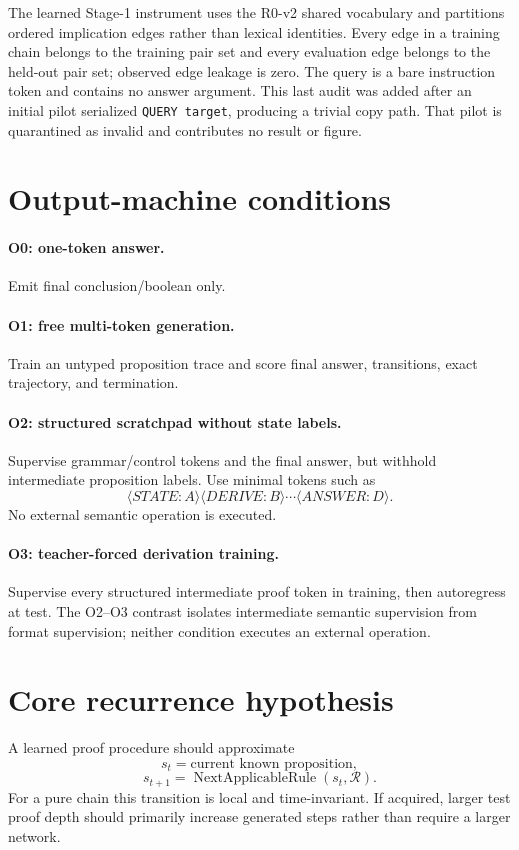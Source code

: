 \documentclass[10pt]{article}
\begin{document}
The learned Stage-1 instrument uses the R0-v2 shared vocabulary and partitions ordered implication edges rather than lexical identities. Every edge in a training chain belongs to the training pair set and every evaluation edge belongs to the held-out pair set; observed edge leakage is zero. The query is a bare instruction token and contains no answer argument. This last audit was added after an initial pilot serialized \texttt{QUERY target}, producing a trivial copy path. That pilot is quarantined as invalid and contributes no result or figure.

\section{Output-machine conditions}
\paragraph{O0: one-token answer.} Emit final conclusion/boolean only.
\paragraph{O1: free multi-token generation.} Train an untyped proposition trace and score final answer, transitions, exact trajectory, and termination.
\paragraph{O2: structured scratchpad without state labels.} Supervise grammar/control tokens and the final answer, but withhold intermediate proposition labels. Use minimal tokens such as
\[
\langle STATE:A\rangle\langle DERIVE:B\rangle\cdots\langle ANSWER:D\rangle.
\]
No external semantic operation is executed.
\paragraph{O3: teacher-forced derivation training.} Supervise every structured intermediate proof token in training, then autoregress at test. The O2--O3 contrast isolates intermediate semantic supervision from format supervision; neither condition executes an external operation.

\section{Core recurrence hypothesis}
A learned proof procedure should approximate
\[
s_t=\text{current known proposition},
\]
\[
s_{t+1}=\operatorname{NextApplicableRule}(s_t,\mathcal R).
\]
For a pure chain this transition is local and time-invariant. If acquired, larger test proof depth should primarily increase generated steps rather than require a larger network.
\end{document}
